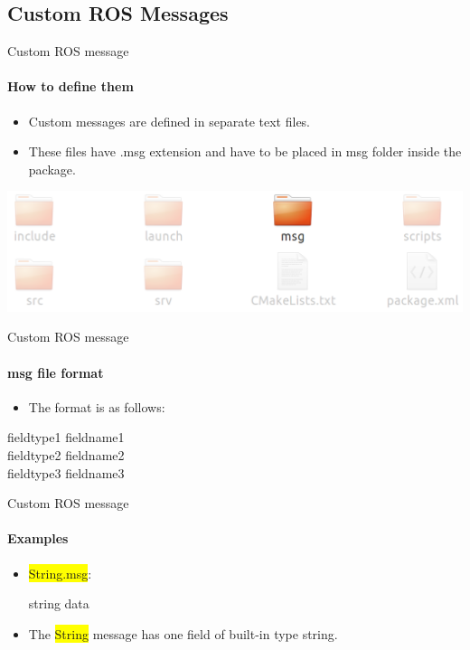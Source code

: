 \documentclass{beamer}
\begin{document}
\subsection{Custom ROS Messages}
\begin{frame}{Custom ROS message}
\framesubtitle{How to define them}    
    \begin{itemize}
        \item Custom messages are defined in separate text files.
        
        \item These files have {\ttfamily \colorbox{gray!30!white}{.msg}} extension and have to be placed in {\ttfamily \colorbox{gray!30!white}{msg}} folder inside the package.
    \end{itemize}
    \includegraphics[width=1\linewidth]{figures/package3.png}
\end{frame}



\begin{frame}{Custom ROS message}
    \framesubtitle{msg file format}  
    
    \begin{itemize}
        \item The format is as follows:
    \end{itemize}
      
    \begin{focus}
        \ttfamily
    fieldtype1  \hspace{0.5cm} fieldname1\\
    fieldtype2  \hspace{0.5cm} fieldname2\\
    fieldtype3  \hspace{0.5cm} fieldname3
    \end{focus}
\end{frame}



\begin{frame}{Custom ROS message}
    \framesubtitle{Examples}  
    
    \begin{itemize}
        \item {\ttfamily \colorbox{yellow}{String.msg}}:
   
    
    \begin{focus}
        \ttfamily
        string data
    \end{focus}
    
    
    \item The {\ttfamily \colorbox{yellow}{String}} message has one field of built-in type {\ttfamily \colorbox{gray!30!white}{string}}.
     \end{itemize}
\end{frame}
\end{document}
